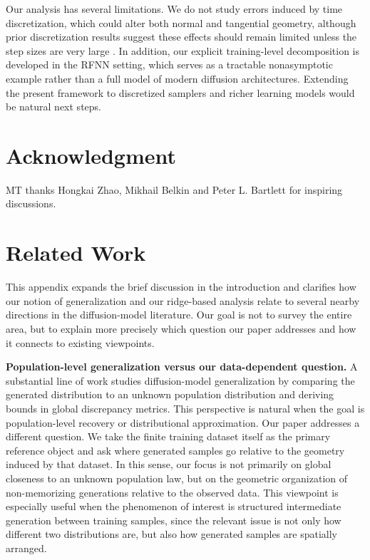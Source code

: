 \documentclass[11pt]{article}
\begin{document}
Our analysis has several limitations. We do not study errors induced by time discretization, which could alter both normal and tangential geometry, although prior discretization results suggest these effects should remain limited unless the step sizes are very large \citep{lee2022convergence,de2022convergence,chen2022sampling,chen2023improved,benton2024nearly,conforti2023score,wang2024evaluating}. In addition, our explicit training-level decomposition is developed in the RFNN setting, which serves as a tractable nonasymptotic example rather than a full model of modern diffusion architectures. Extending the present framework to discretized samplers and richer learning models would be natural next steps.

\section*{Acknowledgment} MT thanks Hongkai Zhao, Mikhail Belkin and Peter L. Bartlett for inspiring discussions.

\newpage


\newpage
\appendix

\tableofcontents


\section{Related Work}\label{append:related work}

This appendix expands the brief discussion in the introduction and clarifies how our notion of generalization and our ridge-based analysis relate to several nearby directions in the diffusion-model literature. Our goal is not to survey the entire area, but to explain more precisely which question our paper addresses and how it connects to existing viewpoints.

\noindent\textbf{Population-level generalization versus our data-dependent question.}
A substantial line of work \citep[e.g.][]{wang2024evaluating,bertrand2025closed,ye2025provable,bonnaire2025diffusion} studies diffusion-model generalization by comparing the generated distribution to an unknown population distribution and deriving bounds in global discrepancy metrics. This perspective is natural when the goal is population-level recovery or distributional approximation. Our paper addresses a different question. We take the finite training dataset itself as the primary reference object and ask where generated samples go relative to the geometry induced by that dataset. In this sense, our focus is not primarily on global closeness to an unknown population law, but on the geometric organization of non-memorizing generations relative to the observed data. This viewpoint is especially useful when the phenomenon of interest is structured intermediate generation between training samples, since the relevant issue is not only how different two distributions are, but also how generated samples are spatially arranged.
\end{document}
